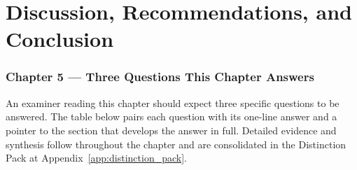 

\chapter{Discussion, Recommendations, and Conclusion}

\subsection*{Chapter 5 --- Three Questions This Chapter Answers}
\label{sec:ch5_three_questions}

\noindent An examiner reading this chapter should expect three specific questions to be answered. The table below pairs each question with its one-line answer and a pointer to the section that develops the answer in full. Detailed evidence and synthesis follow throughout the chapter and are consolidated in the Distinction Pack at Appendix~\ref{app:distinction_pack}.

